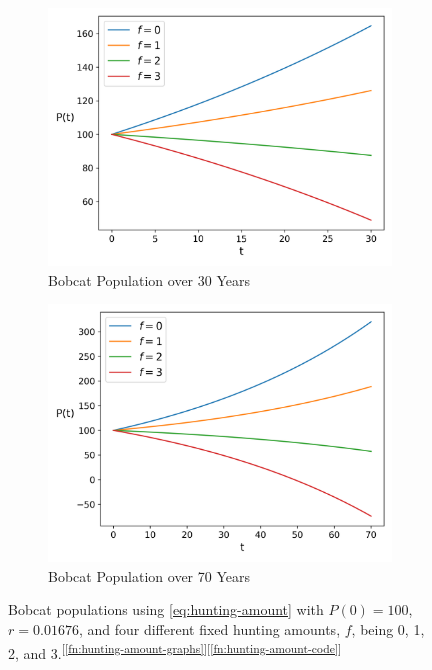 \documentclass{article}
\begin{document}
\begin{figure}[h]
    \centering
    \begin{subfigure}{.5\textwidth}
        \centering
        \includegraphics[width=.95\linewidth]{./hunting/amount_short_term.png}
        \caption{Bobcat Population over 30 Years}
        \label{fig:hunting-amount-short-term}
    \end{subfigure}%
    \begin{subfigure}{.5\textwidth}
        \centering
        \includegraphics[width=.95\linewidth]{./hunting/amount_long_term.png}
        \caption{Bobcat Population over 70 Years}
        \label{fig:hunting-amount-long-term}
    \end{subfigure}
    \caption{Bobcat populations using \cref{eq:hunting-amount} with $P(0) = 100$, $r = 0.01676$, and four different fixed hunting amounts, $f$, being 0, 1, 2, and 3.\textsuperscript{[\protect\ref{fn:hunting-amount-graphs}][\protect\ref{fn:hunting-amount-code}]}}
    \label{fig:3}
\end{figure}
\end{document}
